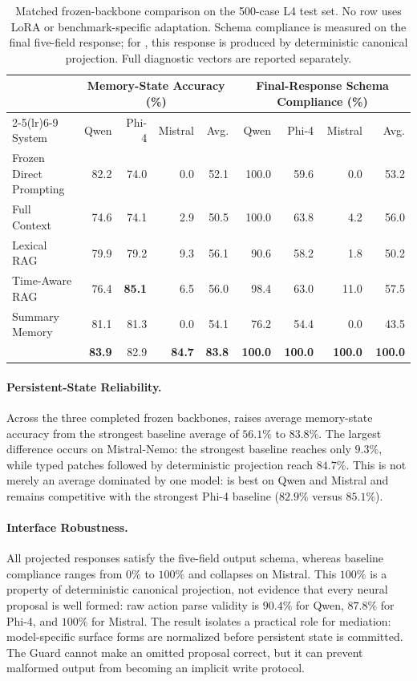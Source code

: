 \begin{table}[t]
\centering
\small
\setlength{\tabcolsep}{5pt}
\begin{tabular}{lrrrrrrrr}
\toprule
& \multicolumn{4}{c}{Memory-State Accuracy (\%)} & \multicolumn{4}{c}{Final-Response Schema Compliance (\%)} \\
\cmidrule(lr){2-5}\cmidrule(lr){6-9}
System & Qwen & Phi-4 & Mistral & Avg. & Qwen & Phi-4 & Mistral & Avg. \\
\midrule
Frozen Direct Prompting & 82.2 & 74.0 & 0.0 & 52.1 & 100.0 & 59.6 & 0.0 & 53.2 \\
Full Context & 74.6 & 74.1 & 2.9 & 50.5 & 100.0 & 63.8 & 4.2 & 56.0 \\
Lexical RAG & 79.9 & 79.2 & 9.3 & 56.1 & 90.6 & 58.2 & 1.8 & 50.2 \\
Time-Aware RAG & 76.4 & \textbf{85.1} & 6.5 & 56.0 & 98.4 & 63.0 & 11.0 & 57.5 \\
Summary Memory & 81.1 & 81.3 & 0.0 & 54.1 & 76.2 & 54.4 & 0.0 & 43.5 \\
\method{} & \textbf{83.9} & 82.9 & \textbf{84.7} & \textbf{83.8} & \textbf{100.0} & \textbf{100.0} & \textbf{100.0} & \textbf{100.0} \\
\bottomrule
\end{tabular}
\caption{Matched frozen-backbone comparison on the 500-case L4 test set. No row uses LoRA or benchmark-specific adaptation. Schema compliance is measured on the final five-field response; for \method{}, this response is produced by deterministic canonical projection. Full diagnostic vectors are reported separately.}
\label{tab:frozen-results}
\end{table}

\paragraph{Persistent-State Reliability.}
Across the three completed frozen backbones, \method{} raises average memory-state accuracy from the strongest baseline average of $56.1\%$ to $83.8\%$. The largest difference occurs on Mistral-Nemo: the strongest baseline reaches only $9.3\%$, while typed patches followed by deterministic projection reach $84.7\%$. This is not merely an average dominated by one model: \method{} is best on Qwen and Mistral and remains competitive with the strongest Phi-4 baseline ($82.9\%$ versus $85.1\%$).

\paragraph{Interface Robustness.}
All projected \method{} responses satisfy the five-field output schema, whereas baseline compliance ranges from $0\%$ to $100\%$ and collapses on Mistral. This $100\%$ is a property of deterministic canonical projection, not evidence that every neural proposal is well formed: raw action parse validity is $90.4\%$ for Qwen, $87.8\%$ for Phi-4, and $100\%$ for Mistral. The result isolates a practical role for mediation: model-specific surface forms are normalized before persistent state is committed. The Guard cannot make an omitted proposal correct, but it can prevent malformed output from becoming an implicit write protocol.

